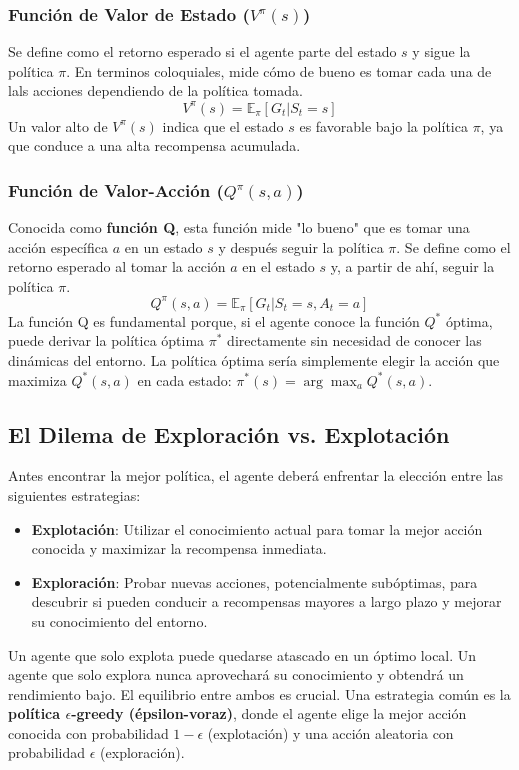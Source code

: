 \documentclass[12pt,a4paper]{book}
\begin{document}
\subsubsection{Función de Valor de Estado ($V^{\pi}(s)$)}
Se define como el retorno esperado si el agente parte del estado $s$ y sigue la política $\pi$. En terminos coloquiales, mide cómo de bueno es tomar cada una de lals acciones dependiendo de la política tomada.
\[ V^{\pi}(s) = \mathbb{E}_{\pi}[G_t | S_t = s] \]
Un valor alto de $V^{\pi}(s)$ indica que el estado $s$ es favorable bajo la política $\pi$, ya que conduce a una alta recompensa acumulada.

\subsubsection{Función de Valor-Acción ($Q^{\pi}(s, a)$)}
Conocida como \textbf{función Q}, esta función mide "lo bueno" que es tomar una acción específica $a$ en un estado $s$ y después seguir la política $\pi$. Se define como el retorno esperado al tomar la acción $a$ en el estado $s$ y, a partir de ahí, seguir la política $\pi$.
\[ Q^{\pi}(s, a) = \mathbb{E}_{\pi}[G_t | S_t = s, A_t = a] \]
La función Q es fundamental porque, si el agente conoce la función $Q^*$ óptima, puede derivar la política óptima $\pi^*$ directamente sin necesidad de conocer las dinámicas del entorno. La política óptima sería simplemente elegir la acción que maximiza $Q^*(s, a)$ en cada estado: $\pi^*(s) = \arg\max_a Q^*(s, a)$.

\subsection{El Dilema de Exploración vs. Explotación}

Antes encontrar la mejor política, el agente deberá enfrentar la elección entre las siguientes estrategias:
\begin{itemize}
    \item \textbf{Explotación}: Utilizar el conocimiento actual para tomar la mejor acción conocida y maximizar la recompensa inmediata.
    \item \textbf{Exploración}: Probar nuevas acciones, potencialmente subóptimas, para descubrir si pueden conducir a recompensas mayores a largo plazo y mejorar su conocimiento del entorno.
\end{itemize}
Un agente que solo explota puede quedarse atascado en un óptimo local. Un agente que solo explora nunca aprovechará su conocimiento y obtendrá un rendimiento bajo. El equilibrio entre ambos es crucial. Una estrategia común es la \textbf{política $\epsilon$-greedy (épsilon-voraz)}, donde el agente elige la mejor acción conocida con probabilidad $1-\epsilon$ (explotación) y una acción aleatoria con probabilidad $\epsilon$ (exploración).
\end{document}
